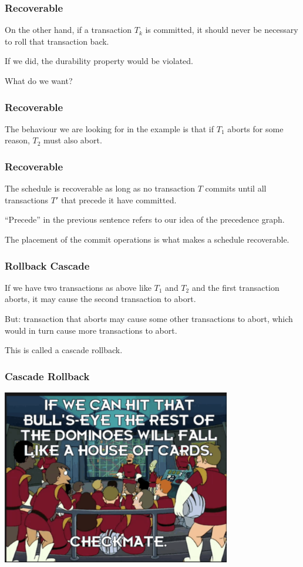 \begin{frame}
\frametitle{Recoverable}

On the other hand, if a transaction $T_{k}$ is committed, it should never be necessary to roll that transaction back. 

If we did, the durability property would be violated. 

What do we want?

\end{frame}

\begin{frame}
\frametitle{Recoverable}


The behaviour we are looking for in the example is that if $T_{1}$ aborts for some reason, $T_{2}$ must also abort.

\end{frame}

\begin{frame}
\frametitle{Recoverable}

The schedule is recoverable as long as no transaction $T$ commits until all transactions $T'$ that precede it have committed. 

``Precede'' in the previous sentence refers to our idea of the precedence graph.

The placement of the commit operations is what makes a schedule recoverable.

\end{frame}



\begin{frame}
\frametitle{Rollback Cascade}

If we have two transactions as above like $T_{1}$ and $T_{2}$ and the first transaction aborts, it may cause the second transaction to abort. 

But: transaction that aborts may cause some other transactions to abort, which would in turn cause more transactions to abort.

This is called a \alert{cascade rollback}.

\end{frame}

\begin{frame}
\frametitle{Cascade Rollback}

\begin{center}
	\includegraphics[width=0.75\textwidth]{images/checkmate.png}
\end{center}


\end{frame}

